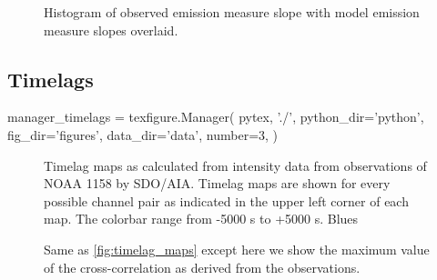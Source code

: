 \begin{figure}
    \caption{Histogram of observed emission measure slope with model emission measure slopes overlaid.}
    \label{fig:em_slope_histogram}
\end{figure}

\subsection{Timelags}\label{timelags}

\begin{pycode}
manager_timelags = texfigure.Manager(
    pytex, './',
    python_dir='python',
    fig_dir='figures',
    data_dir='data',
    number=3,
)
\end{pycode}

\begin{figure*}
    \caption{Timelag maps as calculated from intensity data from observations of \AR{} NOAA 1158 by SDO/AIA. Timelag maps are shown for every possible channel pair as indicated in the upper left corner of each map. The colorbar range from -5000 s to +5000 s. Blues}
    \label{fig:timelag_maps}
\end{figure*}

\begin{figure*}
    \caption{Same as \autoref{fig:timelag_maps} except here we show the maximum value of the cross-correlation as derived from the observations.}
    \label{fig:correlation_maps}
\end{figure*}



